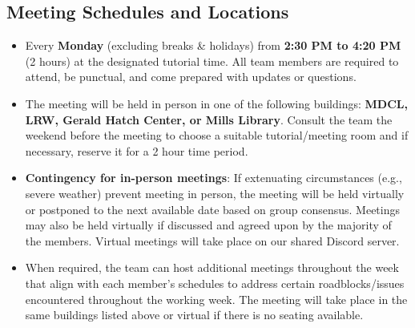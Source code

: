 \documentclass{article}
\begin{document}
\subsection{Meeting Schedules and Locations}

\begin{itemize}
    \item Every \textbf{Monday} (excluding breaks \& holidays) from \textbf{2:30
    PM to 4:20 PM} (2 hours) at the designated tutorial time. All team members
    are required to attend, be punctual, and come prepared with updates or
    questions.
    
    \item The meeting will be held in person in one of the following buildings:
    \textbf{MDCL, LRW, Gerald Hatch Center, or Mills Library}. Consult the team
    the weekend before the meeting to choose a suitable tutorial/meeting room
    and if necessary, reserve it for a 2 hour time period.
    
    \item \textbf{Contingency for in-person meetings}: If extenuating
    circumstances (e.g., severe weather) prevent meeting in person, the meeting
    will be held virtually or postponed to the next available date based on
    group consensus. Meetings may also be held virtually if discussed and agreed
    upon by the majority of the members. Virtual meetings will take place on our
    shared Discord server.

    \item When required, the team can host additional meetings throughout the
    week that align with each member's schedules to address certain
    roadblocks/issues encountered throughout the working week. The meeting will
    take place in the same buildings listed above or virtual if there is no
    seating available.
\end{itemize}
\end{document}
